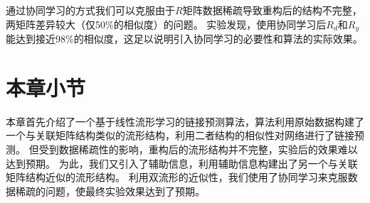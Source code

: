 通过协同学习的方式我们可以克服由于$R$矩阵数据稀疏导致重构后的结构不完整，两矩阵差异较大（仅50\%的相似度）的问题。
实验发现，使用协同学习后$R_d$和$R_y$能达到接近98\%的相似度，这足以说明引入协同学习的必要性和算法的实际效果。

\section{本章小节}
本章首先介绍了一个基于线性流形学习的链接预测算法，算法利用原始数据构建了一个与关联矩阵结构类似的流形结构，利用二者结构的相似性对网络进行了链接预测。
但受到数据稀疏性的影响，重构后的流形结构并不完整，实验后的效果难以达到预期。
为此，我们又引入了辅助信息，利用辅助信息构建出了另一个与关联矩阵结构近似的流形结构。
利用双流形的近似性，我们使用了协同学习来克服数据稀疏的问题，使最终实验效果达到了预期。
